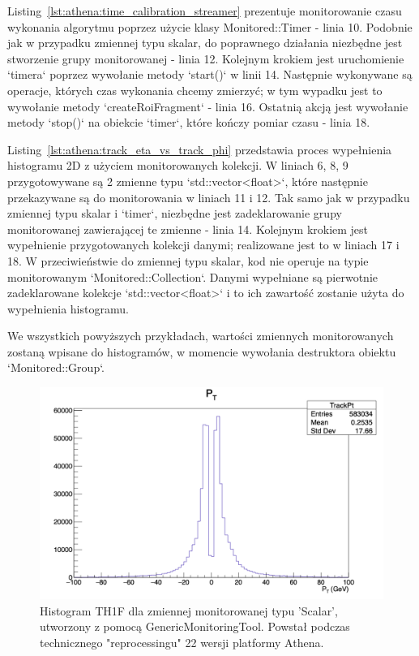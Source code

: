 Listing~\ref{lst:athena:time_calibration_streamer} prezentuje monitorowanie czasu wykonania algorytmu poprzez użycie klasy Monitored::Timer - linia 10. 
Podobnie jak w przypadku zmiennej typu skalar, do poprawnego działania niezbędne jest stworzenie grupy monitorowanej - linia 12.
Kolejnym krokiem jest uruchomienie `timera` poprzez wywołanie metody `start()` w linii 14.
Następnie wykonywane są operacje, których czas wykonania chcemy zmierzyć; w tym wypadku jest to wywołanie metody `createRoiFragment` - linia 16.
Ostatnią akcją jest wywołanie metody `stop()` na obiekcie `timer`, które kończy pomiar czasu - linia 18.

Listing~\ref{lst:athena:track_eta_vs_track_phi} przedstawia proces wypełnienia histogramu 2D z użyciem monitorowanych kolekcji.
W liniach 6, 8, 9 przygotowywane są 2 zmienne typu `std::vector<float>`, które następnie przekazywane są do monitorowania w liniach 11 i 12.
Tak samo jak w przypadku zmiennej typu skalar i `timer`, niezbędne jest zadeklarowanie grupy monitorowanej zawierającej te zmienne - linia 14.
Kolejnym krokiem jest wypełnienie przygotowanych kolekcji danymi; realizowane jest to w liniach 17 i 18. 
W przeciwieństwie do zmiennej typu skalar, kod nie operuje na typie monitorowanym `Monitored::Collection`. 
Danymi wypełniane są pierwotnie zadeklarowane kolekcje `std::vector<float>` i to ich zawartość zostanie użyta do wypełnienia histogramu.

We wszystkich powyższych przykładach, wartości zmiennych monitorowanych zostaną wpisane do histogramów, w momencie wywołania destruktora obiektu `Monitored::Group`.

\begin{figure}[!ht]
\centering
\includegraphics[width=1\textwidth]{img/histogram_TH1.png}
\caption{
Histogram TH1F dla zmiennej monitorowanej typu 'Scalar', utworzony z pomocą GenericMonitoringTool. Powstał podczas technicznego "reprocessingu" 22 wersji platformy Athena.
}
\label{fig:athena:histogram_TH1}
\end{figure}


